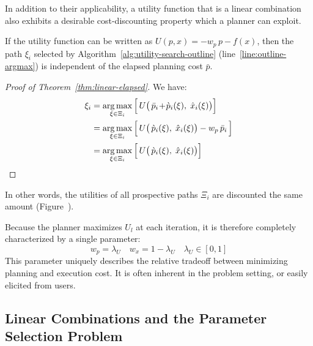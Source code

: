 In addition to their applicability,
a utility function that is a linear combination
also exhibits a desirable cost-discounting property which a planner
can exploit.

\begin{theorem}
   \label{thm:linear-elapsed}
   If the utility function can be written as $U(p,x) = - w_p \, p - f(x)$,
   then the path $\xi_i$ selected by
   Algorithm~\ref{alg:utility-search-outline}
   (line~\ref{line:outline-argmax})
   is independent of the elapsed planning cost $\bar{p}$.
\end{theorem}

\begin{proof}[Proof of Theorem~\ref{thm:linear-elapsed}]
   We have:
   \begin{align}
      \xi_i &= \operatorname*{arg\,max}_{\xi \in \Xi_i}
      \Big[ \, U\big( \, \bar{p}_i \! + \! \grave{p}_i(\xi), \; \hat{x}_i(\xi) \big) \Big] \\
      &= \operatorname*{arg\,max}_{\xi \in \Xi_i}
      \Big[ \,  U\big( \, \grave{p}_i(\xi), \; \hat{x}_i(\xi) \big) - w_p \, \bar{p}_i \, \Big] \\
      &= \operatorname*{arg\,max}_{\xi \in \Xi_i}
      \Big[ \, U\big( \, \grave{p}_i(\xi), \; \hat{x}_i(\xi) \big) \Big]
   \end{align}
\end{proof}

In other words, the utilities of all prospective paths $\Xi_i$
are discounted the same amount
(Figure~).

Because the planner maximizes $U_l$ at each iteration,
it is therefore completely characterized by a single parameter:
\begin{equation}
   w_p = \lambda_U \quad w_x = 1 - \lambda_U \quad
   \lambda_U \in [0,1]
\end{equation}
This parameter uniquely describes the relative tradeoff between
minimizing planning and execution cost.
It is often inherent in the problem setting,
or easily elicited from users.

\subsection{Linear Combinations and the Parameter Selection Problem}

